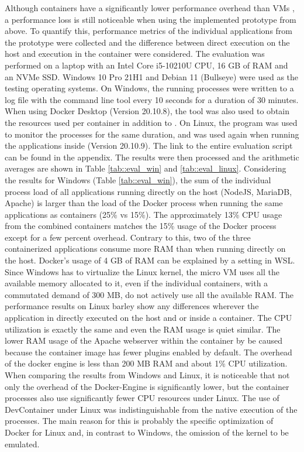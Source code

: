         Although containers have a significantly lower performance overhead than \ac{VM}s \cite{ieee_perfomance}, a performance loss is still noticeable when using the implemented prototype from above. To quantify this, performance metrics of the individual applications from the prototype were collected and the difference between direct execution on the host and execution in the container were considered.\newline
        The evaluation was performed on a laptop with an Intel Core i5-10210U CPU, 16 GB of RAM and an NVMe SSD. Windows 10 Pro 21H1 and Debian 11 (Bullseye) were used as the testing operating systems. On Windows, the running processes were written to a log file with the command line tool  every 10 seconds for a duration of 30 minutes. When using Docker Desktop (Version 20.10.8), the tool  was also used to obtain the resources used per container in addition to . On Linux, the  program was used to monitor the processes for the same duration, and  was used again when running the applications inside  (Version 20.10.9). The link to the entire evaluation script can be found in the appendix. The results were then processed and the arithmetic averages are shown in Table \ref{tab::eval_win} and \ref{tab::eval_linux}.\newline
        Considering the results for Windows (Table \ref{tab::eval_win}), the sum of the individual process load of all applications running directly on the host (NodeJS, MariaDB, Apache) is larger than the load of the Docker process when running the same applications as containers (25\% vs 15\%). The approximately 13\% CPU usage from the combined containers matches the 15\% usage of the Docker process except for a few percent overhead. Contrary to this, two of the three containerized applications consume more RAM than when running directly on the host. Docker's usage of 4 GB of RAM can be explained by a setting in \ac{WSL}. Since Windows has to virtualize the Linux kernel, the micro \ac{VM} uses all the available memory allocated to it, even if the individual containers, with a commutated demand of 300 MB, do not actively use all the available RAM.\newline
        The performance results on Linux barley show any differences wherever the application in directly executed on the host and or inside a container. The CPU utilization is exactly the same and even the RAM usage is quiet similar. The lower RAM usage of the Apache webserver within the container by be caused because the container image has fewer plugins enabled by default. The overhead of the docker engine is less than 200 MB RAM and about 1\% CPU utilization. When comparing the results from Windows and Linux, it is noticeable that not only the overhead of the Docker-Engine is significantly lower, but the container processes also use significantly fewer CPU resources under Linux. The use of DevContainer under Linux was indistinguishable from the native execution of the processes. The main reason for this is probably the specific optimization of Docker for Linux and, in contrast to Windows, the omission of the kernel to be emulated.\newline
